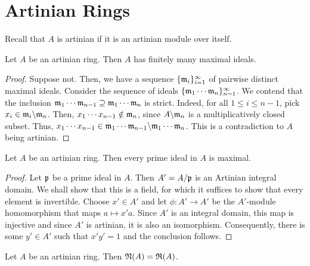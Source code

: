 \section{Artinian Rings}

Recall that $A$ is artinian if it is an artinian module over itself.

\begin{proposition}
    Let $A$ be an artinian ring. Then $A$ has finitely many maximal ideals.
\end{proposition}
\begin{proof}
    Suppose not. Then, we have a sequence $\{\mathfrak m_i\}_{i = 1}^\infty$ of pairwise distinct maximal ideals. Consider the sequence of ideals $\{\mathfrak m_1\cdots\mathfrak m_n\}_{n = 1}^\infty$. We contend that the inclusion $\mathfrak m_1\cdots\mathfrak m_{n - 1}\supseteq\mathfrak m_1\cdots\mathfrak m_n$ is strict. Indeed, for all $1\le i\le n - 1$, pick $x_i\in\mathfrak m_i\backslash\mathfrak m_n$. Then, $x_1\cdots x_{n - 1}\notin\mathfrak m_n$, since $A\backslash\mathfrak m_n$ is a multiplicatively closed subset. Thus, $x_1\cdots x_{n - 1}\in\mathfrak m_1\cdots\mathfrak m_{n - 1}\backslash\mathfrak m_1\cdots\mathfrak m_n$. This is a contradiction to $A$ being artinian.
\end{proof}

\begin{proposition}
    Let $A$ be an artinian ring. Then every prime ideal in $A$ is maximal.
\end{proposition}
\begin{proof}
    Let $\mathfrak p$ be a prime ideal in $A$. Then $A' = A/\mathfrak p$ is an Artinian integral domain. We shall show that this is a field, for which it suffices to show that every element is invertible. Choose $x'\in A'$ and let $\phi: A'\to A'$ be the $A'$-module homomorphism that maps $a\mapsto x'a$. Since $A'$ is an integral domain, this map is injective and since $A'$ is artinian, it is also an isomorphism. Consequently, there is some $y'\in A'$ such that $x'y' = 1$ and the conclusion follows.
\end{proof}

\begin{corollary}
    Let $A$ be an artinian ring. Then $\mathfrak N(A) = \mathfrak R(A)$.
\end{corollary}

